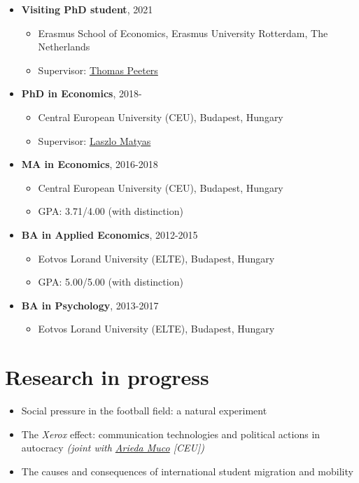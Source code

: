 \documentclass[a4paper,11pt]{article}
\begin{document}
\begin{itemize}

\item \textbf{Visiting PhD student}, 2021
\begin{itemize}
  \item Erasmus School of Economics, Erasmus University Rotterdam, The Netherlands
  \item Supervisor: \href{https://sites.google.com/site/thpeeter/}{Thomas Peeters}
\end{itemize}

\item \textbf{PhD in Economics}, 2018-
\begin{itemize}
  \item Central European University (CEU), Budapest, Hungary
  \item Supervisor: \href{http://www.personal.ceu.hu/staff/matyas/}{Laszlo Matyas}
\end{itemize}

\item \textbf{MA in Economics}, 2016-2018
\begin{itemize}
  \item Central European University (CEU), Budapest, Hungary
  \item GPA: 3.71/4.00 (with distinction)
\end{itemize}

\item \textbf{BA in Applied Economics}, 2012-2015
\begin{itemize}
  \item Eotvos Lorand University (ELTE), Budapest, Hungary
  \item GPA: 5.00/5.00 (with distinction)
  \end{itemize}


\item \textbf{BA in Psychology}, 2013-2017
\begin{itemize}
  \item Eotvos Lorand University (ELTE), Budapest, Hungary
  \end{itemize}
\end{itemize}


\section*{Research in progress}

\begin{itemize}
  \item Social pressure in the football field: a natural experiment
  \item The \textit{Xerox} effect: communication technologies and political actions in autocracy \textit{(joint with \href{https://sites.google.com/view/ariedamuco/}{Arieda Muco} [CEU])}
  \item The causes and consequences of international student migration and mobility
\end{itemize}
\end{document}
